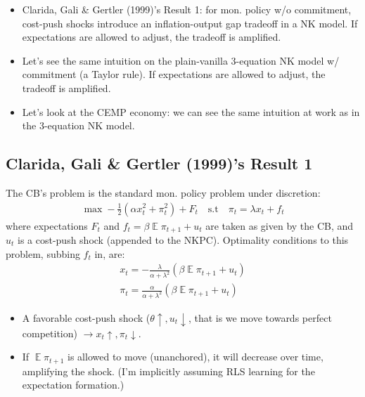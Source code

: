 \documentclass[11pt]{article}
\renewcommand{\[}{\begin{equation}}
\renewcommand{\]}{\end{equation}}
\DeclareMathOperator{\E}{\mathbb{E}}
\begin{document}
\begin{itemize}
\item Clarida, Gali \& Gertler (1999)'s Result 1: for mon. policy w/o commitment, cost-push shocks introduce an inflation-output gap tradeoff in a NK model. If expectations are allowed to adjust, the tradeoff is amplified.
\item Let's see the same intuition on the plain-vanilla 3-equation NK model w/ commitment (a Taylor rule). If expectations are allowed to adjust, the tradeoff is amplified.
\item Let's look at the CEMP economy: we can see the same intuition at work as in the 3-equation NK model.
\end{itemize}


\subsection{Clarida, Gali \& Gertler (1999)'s Result 1}
The CB's problem is the standard mon. policy problem under discretion:
\begin{align}
\max -\frac{1}{2}(\alpha x_t^2 + \pi_t^2 ) + F_t \quad \text{s.t} \quad \pi_t = \lambda x_t + f_t
\end{align}
where expectations $F_t$ and $f_t = \beta \E \pi_{t+1} + u_t$ are taken as given by the CB, and $u_t$ is a cost-push shock (appended to the NKPC). Optimality conditions to this problem, subbing $f_t$ in, are:
\begin{align}
x_t = -\frac{\lambda}{\alpha + \lambda^2}(\beta \E \pi_{t+1} + u_t) \\
\pi_t = \frac{\alpha}{\alpha + \lambda^2}(\beta \E \pi_{t+1} + u_t) 
\end{align}
\begin{itemize}
\item A favorable cost-push shock ($\theta  \uparrow, u_t \downarrow$, that is we move towards perfect competition) $\rightarrow x_t \uparrow, \pi_t \downarrow$.
\item If $\E \pi_{t+1}$ is allowed to move (unanchored), it will decrease over time, amplifying the shock. (I'm implicitly assuming RLS learning for the expectation formation.)
\end{itemize}
\end{document}
